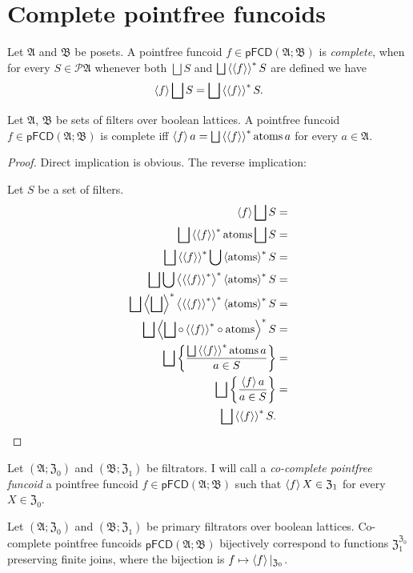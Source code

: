 \section{Complete pointfree funcoids}
\begin{defn}
Let $\mathfrak{A}$ and $\mathfrak{B}$
be posets. A pointfree funcoid $f\in\mathsf{pFCD}(\mathfrak{A};\mathfrak{B})$
is \emph{complete}, when for every $S\in\mathscr{P}\mathfrak{A}$
whenever both $\bigsqcup S$ and $\bigsqcup\left\langle \left\langle f\right\rangle\right\rangle ^{\ast}S$
are defined we have
\[
\left\langle f\right\rangle\bigsqcup S=\bigsqcup\left\langle \left\langle f\right\rangle\right\rangle ^{\ast}S.
\]
\end{defn}
\begin{prop}
Let $\mathfrak{A}$, $\mathfrak{B}$ be sets of filters over boolean
lattices. A pointfree funcoid $f\in\mathsf{pFCD}(\mathfrak{A};\mathfrak{B})$
is complete iff $\left\langle f\right\rangle a=\bigsqcup\left\langle \left\langle f\right\rangle\right\rangle ^{\ast}\operatorname{atoms} a$
for every $a\in\mathfrak{A}$.\end{prop}
\begin{proof}
Direct implication is obvious. The reverse implication:

Let $S$ be a set of filters.
\begin{align*}
\left\langle f\right\rangle\bigsqcup S & =\\
\bigsqcup\left\langle \left\langle f\right\rangle\right\rangle ^{\ast}\operatorname{atoms}\bigsqcup S & =\\
\bigsqcup\left\langle \left\langle f\right\rangle\right\rangle ^{\ast}\bigcup\left\langle \operatorname{atoms}\right\rangle ^{\ast}S & =\\
\bigsqcup\bigcup\left\langle \left\langle \left\langle f\right\rangle\right\rangle ^{\ast}\right\rangle ^{\ast}\left\langle \operatorname{atoms}\right\rangle ^{\ast}S & =\\
\bigsqcup\left\langle \bigsqcup\right\rangle ^{\ast}\left\langle \left\langle \left\langle f\right\rangle\right\rangle ^{\ast}\right\rangle ^{\ast}\left\langle \operatorname{atoms}\right\rangle ^{\ast}S & =\\
\bigsqcup\left\langle \bigsqcup\circ\left\langle \left\langle f\right\rangle\right\rangle ^{\ast}\circ\operatorname{atoms}\right\rangle ^{\ast}S & =\\
\bigsqcup\left\{ \frac{\bigsqcup\left\langle \left\langle f\right\rangle\right\rangle ^{\ast}\operatorname{atoms} a}{a\in S}\right\} & =\\
\bigsqcup\left\{ \frac{\left\langle f\right\rangle a}{a\in S}\right\} & =\\
\bigsqcup\left\langle \left\langle f\right\rangle\right\rangle ^{\ast}S.
\end{align*}
\end{proof}
\begin{defn}
Let $(\mathfrak{A};\mathfrak{Z}_{0})$
and $(\mathfrak{B};\mathfrak{Z}_{1})$ be filtrators. I will call a \emph{co-complete pointfree funcoid}
a pointfree funcoid $f\in\mathsf{pFCD}(\mathfrak{A};\mathfrak{B})$
such that $\left\langle f\right\rangle X\in\mathfrak{Z}_1$ for every $X\in\mathfrak{Z}_0$.\end{defn}
\begin{prop}
Let $(\mathfrak{A};\mathfrak{Z}_{0})$ and $(\mathfrak{B};\mathfrak{Z}_{1})$
be primary filtrators over boolean lattices. Co-complete pointfree
funcoids $\mathsf{pFCD}(\mathfrak{A};\mathfrak{B})$ bijectively correspond
to functions $\mathfrak{Z}_{1}^{\mathfrak{Z}_{0}}$ preserving finite
joins, where the bijection is $f\mapsto\left\langle f\right\rangle|_{\mathfrak{Z}_{0}}$.\end{prop}
